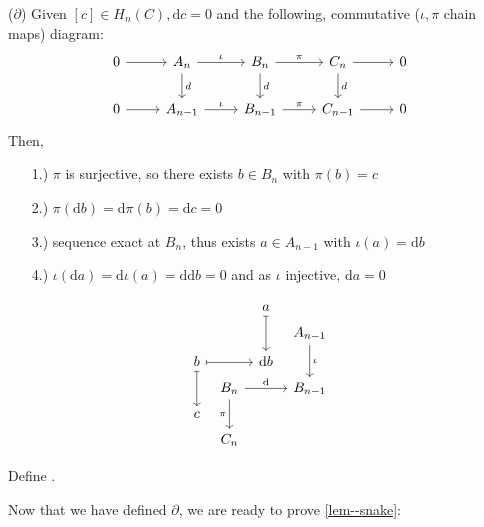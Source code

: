 \documentclass[a4paper,11pt]{article}
\begin{document}
				\begin{defi}
					($\partial$) Given $[c]\in H_n(C), \mathrm{d}c=0$ and the following, commutative ($\iota,\pi$ chain maps) diagram:
					\begin{equation*}
						\begin{tikzcd}
							0\ar[r]& A_n\ar[d,"d"]\ar[r,"\iota"] & B_n\ar[d,"d"]\ar[r,"\pi"]& C_n\ar[d,"d"]\ar[r]& 0\\
							0\ar[r]& A_{n-1}\ar[r,"\iota"] & B_{n-1}\ar[r,"\pi"]& C_{n-1}\ar[r]& 0
						\end{tikzcd}
					\end{equation*}
					Then,
					\begin{enumerate}
						\item[1.)] $\pi$ is surjective, so there exists $b\in B_n$ with $\pi (b)=c$
						\item[2.)] $\pi(\mathrm{d}b)=\mathrm{d}\pi(b)=\mathrm{d}c=0$
						\item[3.)] sequence exact at $B_n$, thus exists $a\in A_{n-1}$ with $\iota(a)=\mathrm{d}b$
						\item[4.)] $\iota(\mathrm{d}a)=\mathrm{d}\iota(a)=\mathrm{d}\mathrm{d}b=0$ and as $\iota$ injective, $\mathrm{d}a=0$     
					\end{enumerate}
					\begin{equation*}
						\begin{tikzcd}[column sep=tiny,row sep=tiny]
							& & a\ar[dd,mapsto] & \\
							& & & A_{n-1}\ar[dd,"\iota"]\\
							b\ar[rr,mapsto] & & \mathrm{d}b &\\
							& B_n\ar[rr,"\mathrm{d}"] & & B_{n-1}\\
							c\ar[uu,mapsfrom] & & & \\
							& C_n\ar[uu,leftarrow,"\pi"] & & 
						\end{tikzcd}
					\end{equation*}


					Define \framebox[5em]{$\partial[c]=[a]$}.
				\end{defi}

				Now that we have defined $\partial$, we are ready to prove \autoref{lem--snake}:
\end{document}
